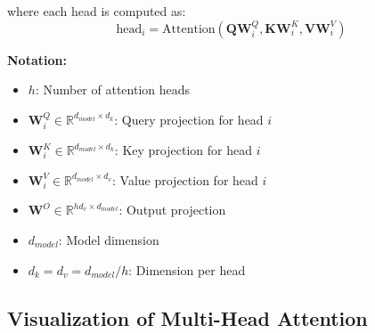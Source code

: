 where each head is computed as:
\begin{equation}
\text{head}_i = \text{Attention}(\mathbf{Q}\mathbf{W}_i^Q, \mathbf{K}\mathbf{W}_i^K, \mathbf{V}\mathbf{W}_i^V)
\end{equation}
\begin{notationbox}
\textbf{Notation:}
\begin{itemize}
    \item $h$: Number of attention heads
    \item $\mathbf{W}_i^Q \in \mathbb{R}^{d_{model} \times d_k}$: Query projection for head $i$
    \item $\mathbf{W}_i^K \in \mathbb{R}^{d_{model} \times d_k}$: Key projection for head $i$
    \item $\mathbf{W}_i^V \in \mathbb{R}^{d_{model} \times d_v}$: Value projection for head $i$
    \item $\mathbf{W}^O \in \mathbb{R}^{hd_v \times d_{model}}$: Output projection
    \item $d_{model}$: Model dimension
    \item $d_k = d_v = d_{model}/h$: Dimension per head
\end{itemize}
\end{notationbox}

\subsection{Visualization of Multi-Head Attention}

